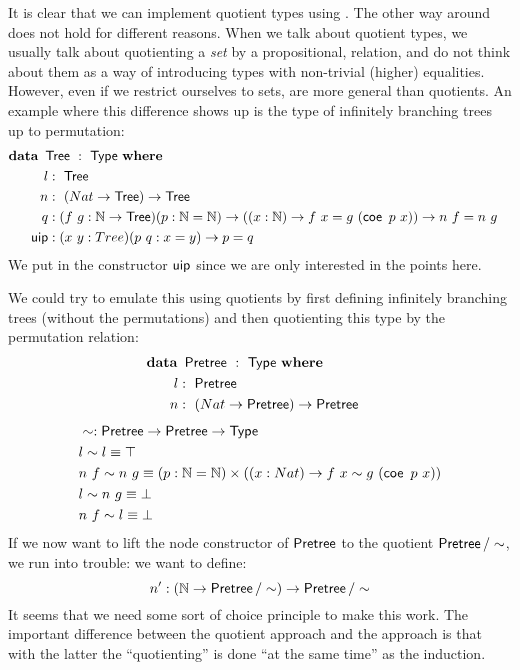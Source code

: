 \documentclass[a4paper,10pt]{report}
\begin{document}
It is clear that we can implement quotient types using \hits. The
other way around does not hold for different reasons. When we talk
about quotient types, we usually talk about quotienting a \emph{set}
by a propositional, relation, and do not think about them as a way of
introducing types with non-trivial (higher) equalities. However, even
if we restrict ourselves to sets, \hits are more general than
quotients. An example where this difference shows up is the type of
infinitely branching trees up to permutation:
%
\begin{alignat*}{2}
  &\rlap{$\data\ \Tree\ :\ \Type\ \where$} \\
  &&\ \ l     &:\ \Tree \\
  &&\ \ n     &:\ (Nat \to \Tree) \to \Tree \\
  &&\ \ q     &:(f\ g : \Nat \to \Tree) (p : \Nat = \Nat) \to ((x : \Nat) \to f\ x = g\ (\coe\ p\ x)) \to n\ f = n\ g \\
  &&\ \ \uipc &:(x\ y : Tree) (p\ q : x = y) \to p = q
\end{alignat*}
%
We put in the constructor $\operatorname{\mathsf{uip}}$ since we are only interested in the points here.

We could try to emulate this \hit using quotients by first defining
infinitely branching trees (without the permutations) and then
quotienting this type by the permutation relation:
%
\begin{alignat*}{2}
  &\rlap{$\data\ \Pretree\ :\ \Type\ \where$} \\
  &&\ \ l     &:\ \Pretree \\
  &&\ \ n     &:\ (Nat \to \Pretree) \to \Pretree \\
\end{alignat*}
%
\begin{align*}
  &\sim : \Pretree \to \Pretree \to \Type \\
  &l \sim l \defeq \top \\
  &n\ f \sim n\ g \defeq (p : \Nat = \Nat) \times ((x : Nat) \to f\ x \sim g\ (\coe\ p\ x)) \\
  &l \sim n\ g \defeq \bot \\
  &n\ f \sim l \defeq \bot
\end{align*}
%
If we now want to lift the node constructor of $\operatorname{\mathsf{Pretree}}$ to the
quotient $\operatorname{\mathsf{Pretree}}/\sim$, we run into trouble: we want to define:
$$
n' : (\mathbb{N} \to \operatorname{\mathsf{Pretree}}/\sim) \to \operatorname{\mathsf{Pretree}}/\sim
$$
It seems that we need some sort of choice principle to make this
work. The important difference between the quotient approach and the
\hit approach is that with the latter the ``quotienting'' is done ``at
the same time'' as the induction.
\end{document}
